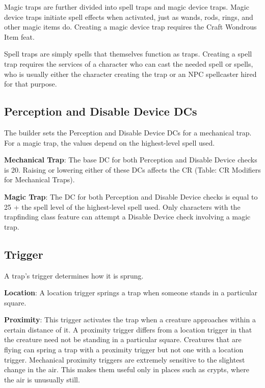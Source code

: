 Magic traps are further divided into spell traps and magic device traps. Magic device traps initiate spell effects when activated, just as wands, rods, rings, and other magic items do. Creating a magic device trap requires the Craft Wondrous Item feat.
				
Spell traps are simply spells that themselves function as traps\textit{. }Creating a spell trap requires the services of a character who can cast the needed spell or spells, who is usually either the character creating the trap or an NPC spellcaster hired for that purpose. 
				
\subsection{Perception and Disable Device DCs}

				
The builder sets the Perception and Disable Device DCs for a mechanical trap. For a magic trap, the values depend on the highest-level spell used.
				
\textbf{Mechanical Trap}: The base DC for both Perception and Disable Device checks is 20. Raising or lowering either of these DCs affects the CR (Table: CR Modifiers for Mechanical Traps). 
				
\textbf{Magic Trap}: The DC for both Perception and Disable Device checks is equal to 25 + the spell level of the highest-level spell used. Only characters with the trapfinding class feature can attempt a Disable Device check involving a magic trap. 
				
\subsection{Trigger}

				
A trap's trigger determines how it is sprung.
				
\textbf{Location}: A location trigger springs a trap when someone stands in a particular square.
				
\textbf{Proximity}: This trigger activates the trap when a creature approaches within a certain distance of it. A proximity trigger differs from a location trigger in that the creature need not be standing in a particular square. Creatures that are flying can spring a trap with a proximity trigger but not one with a location trigger. Mechanical proximity triggers are extremely sensitive to the slightest change in the air. This makes them useful only in places such as crypts, where the air is unusually still.
				
